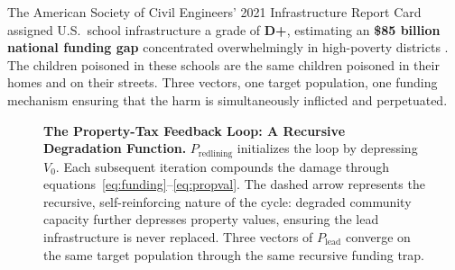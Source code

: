\documentclass[12pt,openany]{book}
\begin{document}
The American Society of Civil Engineers' 2021 Infrastructure Report Card assigned U.S.\ school infrastructure a grade of \textbf{D+}, estimating an \textbf{\$85 billion national funding gap} concentrated overwhelmingly in high-poverty districts \cite{tel_asce}. The children poisoned in these schools are the same children poisoned in their homes and on their streets. Three vectors, one target population, one funding mechanism ensuring that the harm is simultaneously inflicted and perpetuated.

\begin{figure}[htbp]
\centering
{}
\caption{\textbf{The Property-Tax Feedback Loop: A Recursive Degradation Function.} $P_{\text{redlining}}$ initializes the loop by depressing $V_0$. Each subsequent iteration compounds the damage through equations~\eqref{eq:funding}--\eqref{eq:propval}. The dashed arrow represents the recursive, self-reinforcing nature of the cycle: degraded community capacity further depresses property values, ensuring the lead infrastructure is never replaced. Three vectors of $P_{\text{lead}}$ converge on the same target population through the same recursive funding trap.}
\label{fig:property_tax_feedback}
\end{figure}
\end{document}
